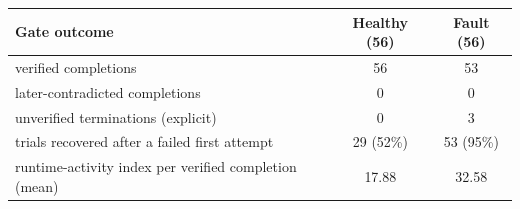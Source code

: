 \begin{tabular}{@{}l c c@{}}
\hline
\textbf{Gate outcome} & \textbf{Healthy (56)} & \textbf{Fault (56)} \\
\hline
verified completions & 56 & 53 \\
later-contradicted completions & 0 & 0 \\
unverified terminations (explicit) & 0 & 3 \\
trials recovered after a failed first attempt & 29 (52\%) & 53 (95\%) \\
runtime-activity index per verified completion (mean) & 17.88 & 32.58 \\
\hline
\end{tabular}
